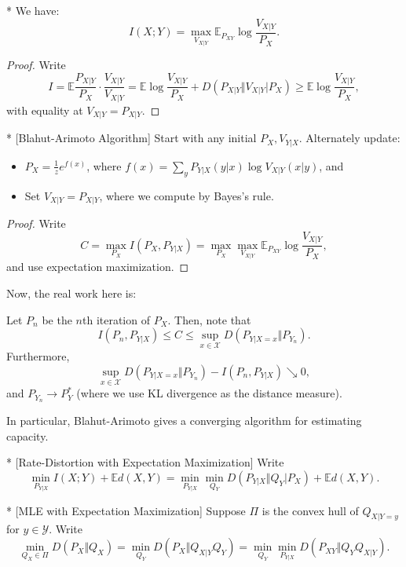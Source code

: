 \begin{fact}*
	We have: \[
		I(X;Y) = \max_{V_{X|Y}} \mathbb E_{P_{XY}} \log \frac{V_{X|Y}}{P_X}.
	\]
\end{fact}

\begin{proof}
	Write \[
		I = \mathbb E \frac{P_{X|Y}}{P_X} \cdot \frac{V_{X|Y}}{V_{X|Y}} = \mathbb E\log \frac{V_{X|Y}}{P_X} + D(P_{X|Y} \Vert V_{X|Y} |P_X) \geq \mathbb E\log \frac{V_{X|Y}}{P_X},
	\]
	with equality at $V_{X|Y} = P_{X|Y}$.
\end{proof}

\begin{cor}*
	[Blahut-Arimoto Algorithm]
	Start with any initial $P_X, V_{Y|X}$. Alternately update:
	\begin{itemize}
		\item $P_X = \frac 1z e^{f(x)}$, where $f(x) = \sum_y P_{Y|X} (y|x) \log V_{X|Y} (x|y)$, and
		\item Set $V_{X|Y} = P_{X|Y}$, where we compute by Bayes's rule. 
	\end{itemize}
\end{cor}

\begin{proof}
	Write \[
		C = \max_{P_X} I(P_X,P_{Y|X}) = \max_{P_X} \max_{V_{X|Y}} \mathbb E_{P_{XY}} \log \frac{V_{X|Y}}{P_X},
	\]
	and use expectation maximization.
\end{proof}

Now, the real work here is:

\begin{thm}
	Let $P_n$ be the $n$th iteration of $P_X$. Then, note that \[
		I(P_n,P_{Y|X}) \leq C \leq \sup_{x\in \mathcal X} D(P_{Y|X=x} \Vert P_{Y_n}).
	\]
	Furthermore, \[
		\sup_{x\in \mathcal X} D(P_{Y|X=x} \Vert P_{Y_n}) - I(P_n, P_{Y|X}) \searrow 0,
	\]
	and $P_{Y_n} \to P_Y^*$ (where we use KL divergence as the distance measure).
\end{thm}

In particular, Blahut-Arimoto gives a converging algorithm for estimating capacity.

\begin{cor}*
	[Rate-Distortion with Expectation Maximization]
	Write \[
		\min_{P_{Y|X}} I(X;Y) + \mathbb E d(X,Y) = \min_{P_{Y|X}} \min_{Q_Y} D(P_{Y|X} \Vert Q_Y | P_X) + \mathbb E d(X,Y).
	\]
\end{cor}

\begin{cor}*
	[MLE with Expectation Maximization]
	Suppose $\Pi$ is the convex hull of $Q_{X|Y=y}$ for $y\in\mathcal Y$.
	Write \[
		\min_{Q_X\in \Pi} D(P_X\Vert Q_X) = \min_{Q_Y} D(P_X\Vert Q_{X|Y}Q_Y) = \min_{Q_Y} \min_{P_{Y|X}} D(P_{XY} \Vert Q_Y Q_{X|Y}).
	\]
\end{cor}

